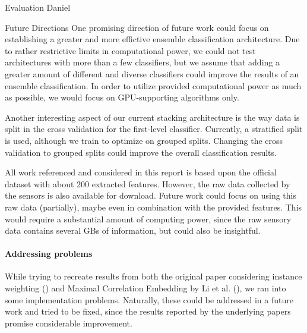 \begin{section}{Evaluation Daniel}
	\begin{subsection}{Future Directions}
		One promising direction of future work could focus on establishing a greater and more effictive ensemble classification architecture. Due to rather restrictive limits in computational power, we could not test architectures with more than a few classifiers, but we assume that adding a greater amount of different and diverse classifiers could improve the results of an ensemble classification. In order to utilize provided computational power as much as possible, we would focus on GPU-supporting algorithms only. \par
		Another interesting aspect of our current stacking architecture is the way data is split in the cross validation for the first-level classifier. Currently, a stratified split is used, although we train to optimize on grouped splits. Changing the cross validation to grouped splits could improve the overall classification results. \par
		All work referenced and considered in this report is based upon the official dataset with about 200 extracted features. However, the raw data collected by the sensors is also available for download. Future work could focus on using this raw data (partially), maybe even in combination with the provided features. This would require a substantial amount of computing power, since the raw sensory data contains several GBs of information, but could also be insightful.
		\paragraph{Addressing problems}
		While trying to recreate results from both the original paper considering instance weighting (\cite{Vaizman18}) and Maximal Correlation Embedding by Li et al. (\cite{Li19}), we ran into some implementation problems. Naturally, these could be addressed in a future work and tried to be fixed, since the results reported by the underlying papers promise considerable improvement.
	\end{subsection}
\end{section}